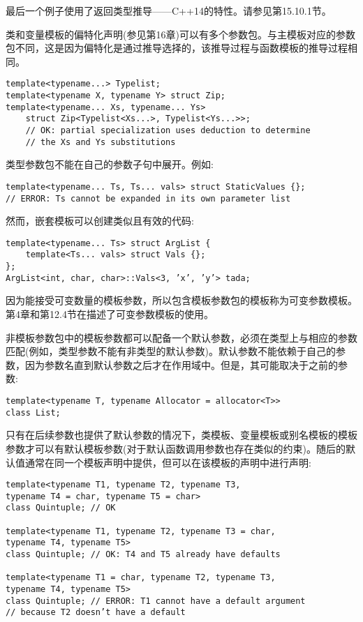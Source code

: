 最后一个例子使用了返回类型推导——C++14的特性。请参见第15.10.1节。

类和变量模板的偏特化声明(参见第16章)可以有多个参数包。与主模板对应的参数包不同，这是因为偏特化是通过推导选择的，该推导过程与函数模板的推导过程相同。

\begin{lstlisting}[style=styleCXX]
template<typename...> Typelist;
template<typename X, typename Y> struct Zip;
template<typename... Xs, typename... Ys>
	struct Zip<Typelist<Xs...>, Typelist<Ys...>>;
	// OK: partial specialization uses deduction to determine
	// the Xs and Ys substitutions
\end{lstlisting}

类型参数包不能在自己的参数子句中展开。例如:

\begin{lstlisting}[style=styleCXX]
template<typename... Ts, Ts... vals> struct StaticValues {};
// ERROR: Ts cannot be expanded in its own parameter list
\end{lstlisting}

然而，嵌套模板可以创建类似且有效的代码:

\begin{lstlisting}[style=styleCXX]
template<typename... Ts> struct ArgList {
	template<Ts... vals> struct Vals {};
};
ArgList<int, char, char>::Vals<3, ’x’, ’y’> tada;
\end{lstlisting}

因为能接受可变数量的模板参数，所以包含模板参数包的模板称为可变参数模板。第4章和第12.4节在描述了可变参数模板的使用。


非模板参数包中的模板参数都可以配备一个默认参数，必须在类型上与相应的参数匹配(例如，类型参数不能有非类型的默认参数)。默认参数不能依赖于自己的参数，因为参数名直到默认参数之后才在作用域中。但是，其可能取决于之前的参数:

\begin{lstlisting}[style=styleCXX]
template<typename T, typename Allocator = allocator<T>>
class List;
\end{lstlisting}

只有在后续参数也提供了默认参数的情况下，类模板、变量模板或别名模板的模板参数才可以有默认模板参数(对于默认函数调用参数也存在类似的约束)。随后的默认值通常在同一个模板声明中提供，但可以在该模板的声明中进行声明:

\begin{lstlisting}[style=styleCXX]
template<typename T1, typename T2, typename T3,
typename T4 = char, typename T5 = char>
class Quintuple; // OK

template<typename T1, typename T2, typename T3 = char,
typename T4, typename T5>
class Quintuple; // OK: T4 and T5 already have defaults

template<typename T1 = char, typename T2, typename T3,
typename T4, typename T5>
class Quintuple; // ERROR: T1 cannot have a default argument
// because T2 doesn’t have a default
\end{lstlisting}

